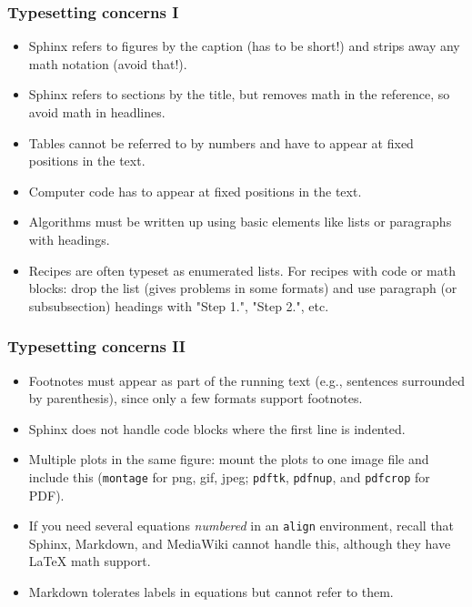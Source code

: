 \documentclass{beamer}
\begin{document}
\begin{frame}
\frametitle{Typesetting concerns I}

\begin{itemize}
 \item<2-> Sphinx refers to figures by the caption (has to be short!) and
   strips away any math notation (avoid that!).

 \item<3-> Sphinx refers to sections by the title, but removes math in the
   reference, so avoid math in headlines.

 \item<4-> Tables cannot be referred to by numbers and have to appear at
   fixed positions in the text.

 \item<5-> Computer code has to appear at fixed positions in the text.

 \item<6-> Algorithms must be written up using basic elements like lists or
   paragraphs with headings.

 \item<7-> Recipes are often typeset as enumerated lists. For recipes with
   code or math blocks: drop the list (gives problems in some formats)
   and use paragraph (or subsubsection) headings with "Step 1.",
   "Step 2.", etc.
\end{itemize}

\noindent
\end{frame}

\begin{frame}
\frametitle{Typesetting concerns II}

\begin{itemize}
 \item<2-> Footnotes must appear as part of the running text (e.g., sentences
   surrounded by parenthesis), since only a few formats support footnotes.

 \item<3-> Sphinx does not handle code blocks where the first line is indented.

 \item<4-> Multiple plots in the same figure: mount the plots to one image
   file and include this (\Verb!montage! for png, gif, jpeg; \Verb!pdftk!, \Verb!pdfnup!,
   and \Verb!pdfcrop! for PDF).

 \item<5-> If you need several equations \emph{numbered} in an \Verb!align! environment,
   recall that Sphinx, Markdown, and MediaWiki cannot handle this,
   although they have {\LaTeX} math support.

 \item<6-> Markdown tolerates labels in equations but cannot refer to them.
\end{itemize}

\noindent

\end{frame}
\end{document}
